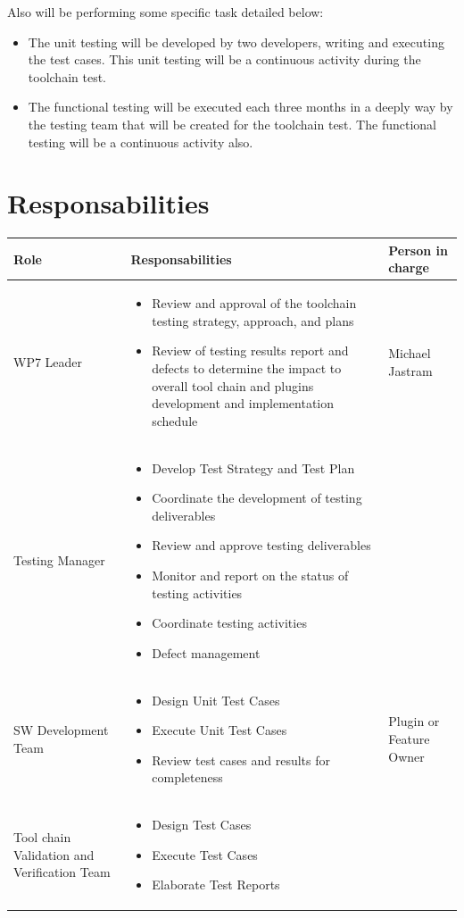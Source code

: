 Also will be performing some specific task detailed below:
\begin{itemize}
\item The unit testing will be developed by two developers, writing and executing the test cases. This unit testing will be a continuous activity during the toolchain test.
\item The functional testing will be executed each three months in a deeply way by the testing team that will be created for the toolchain test. The functional testing will be a continuous activity also.
\end{itemize} 

\section{Responsabilities}
\begin{center}
\begin{longtable}[H]{|p{3cm}|p{8cm}|p{4cm}|}\hline
\textbf{Role} & \textbf{Responsabilities} & \textbf{Person in charge}\\\hline
WP7 Leader & \begin{itemize}
\item Review and approval of the toolchain testing strategy, approach, and plans
\item Review of testing results report and defects to determine the impact to overall tool chain and plugins  development and implementation schedule
\end{itemize}  
 & Michael Jastram\\\hline
Testing Manager & \begin{itemize}
\item Develop Test Strategy and Test Plan
\item Coordinate the development of testing deliverables
\item Review and approve testing deliverables
\item Monitor and report on the status of testing activities
\item Coordinate testing activities
\item Defect management
\end{itemize}  
 & \\\hline
SW Development Team & \begin{itemize}
\item Design Unit Test Cases
\item Execute Unit Test Cases
\item Review test cases and results for completeness
\end{itemize}  & Plugin or Feature Owner\\\hline
Tool chain Validation and Verification Team & \begin{itemize}
\item Design Test Cases
\item Execute Test Cases
\item Elaborate Test Reports
\end{itemize}
& \\\hline
\end{longtable}
\end{center}

